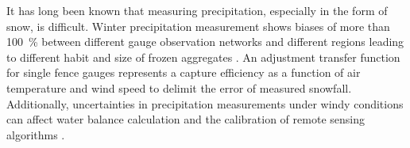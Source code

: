 
\par\medskip
\noindent
It has long been known that measuring precipitation, especially in the form of snow, is difficult. Winter precipitation measurement shows biases of more than \SI{100}{\percent} between different gauge observation networks and different regions leading to different habit and size of frozen aggregates \citep{kochendorfer_analysis_2017}. An adjustment transfer function for single fence gauges represents a capture efficiency as a function of air temperature and wind speed to delimit the error of measured snowfall.
Additionally, uncertainties in precipitation measurements under windy conditions can affect water balance calculation and the calibration of remote sensing algorithms \citep{wolff_derivation_2015}. 
\par\medskip
\noindent
